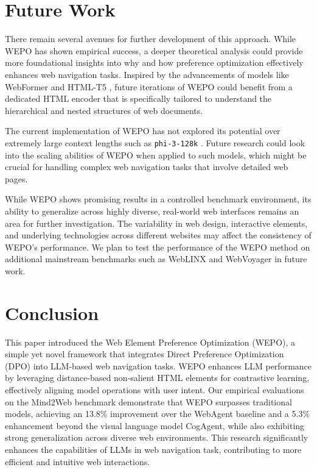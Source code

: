 \documentclass{article}
\begin{document}
  \section{Future Work}
  There remain several avenues for further development of this approach. While WEPO has shown empirical success, a deeper theoretical analysis could provide more foundational insights into why and how preference optimization effectively enhances web navigation tasks. Inspired by the advancements of models like WebFormer \citep{wang2022webformer} and HTML-T5 \citep{gur2023understanding}, future iterations of WEPO could benefit from a dedicated HTML encoder that is specifically tailored to understand the hierarchical and nested structures of web documents. 
  
  The current implementation of WEPO has not explored its potential over extremely large context lengths such as \texttt{phi-3-128k} \citep{abdin2024phi}. Future research could look into the scaling abilities of WEPO when applied to such models, which might be crucial for handling complex web navigation tasks that involve detailed web pages.
  
  While WEPO shows promising results in a controlled benchmark environment, its ability to generalize across highly diverse, real-world web interfaces remains an area for further investigation. The variability in web design, interactive elements, and underlying technologies across different websites may affect the consistency of WEPO's performance. We plan to test the performance of the WEPO method on additional mainstream benchmarks such as WebLINX and WebVoyager \citep{lu2024weblinx,he2024webvoyager} in future work.
  
  \section{Conclusion}
  
  This paper introduced the Web Element Preference Optimization (WEPO), a simple yet novel framework that integrates Direct Preference Optimization (DPO) into LLM-based web navigation tasks. WEPO enhances LLM performance by leveraging distance-based non-salient HTML elements for contrastive learning, effectively aligning model operations with user intent. Our empirical evaluations on the Mind2Web benchmark demonstrate that WEPO surpasses traditional models, achieving an 13.8\% improvement over the WebAgent baseline and a 5.3\% enhancement beyond the visual language model CogAgent, while also exhibiting strong generalization across diverse web environments. This research significantly enhances the capabilities of LLMs in web navigation task, contributing to more efficient and intuitive web interactions.
\end{document}
